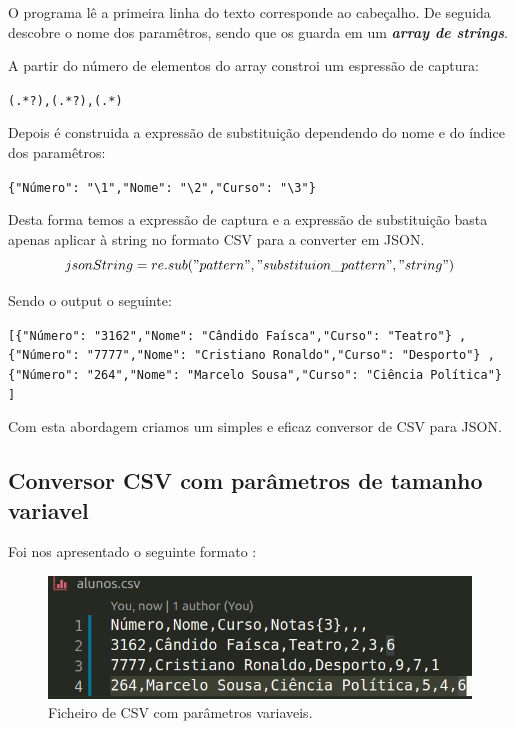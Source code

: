 \documentclass[runningheads]{llncs}
\begin{document}
O programa lê a primeira linha do texto corresponde ao cabeçalho.
De seguida descobre o nome dos paramêtros, sendo que os guarda em um \textit{\textbf{array de strings}}.

\vspace{5mm}
A partir do número de elementos do array constroi um espressão de captura:


\verb|(.*?),(.*?),(.*)|

\vspace{5mm}
Depois é construida a expressão de substituição dependendo do nome e do índice dos paramêtros:

\verb|{"Número": "\1","Nome": "\2","Curso": "\3"}|

\vspace{5mm}
Desta forma temos a expressão de captura e a expressão de substituição basta apenas aplicar à string no formato CSV para a converter em JSON.
\begin{equation}
jsonString = re.sub("pattern","substituion\_pattern","string")
\end{equation}


Sendo o output o seguinte:


\verb|[{"Número": "3162","Nome": "Cândido Faísca","Curso": "Teatro"} ,|
\verb|{"Número": "7777","Nome": "Cristiano Ronaldo","Curso": "Desporto"} ,|
\verb|{"Número": "264","Nome": "Marcelo Sousa","Curso": "Ciência Política"} ]|

\vspace{5mm}
Com esta abordagem criamos um simples e eficaz conversor de CSV para JSON.

\newpage
\subsection{Conversor CSV com parâmetros de tamanho variavel}


Foi nos apresentado o seguinte formato :

\begin{figure}[h]
\centering
\includegraphics[width=\textwidth]{pl02.png}
\caption{Ficheiro de CSV com parâmetros variaveis.} \label{fig1}
\end{figure}
\end{document}
